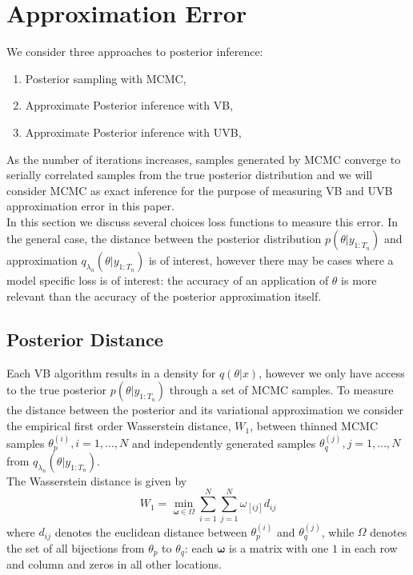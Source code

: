 \documentclass[12pt,a4paper]{article}\usepackage[]{graphicx}\usepackage[]{color}
\begin{document}
\iffalse
\section{Approximation Error}

We consider three approaches to posterior inference:
\begin{enumerate}
\item Posterior sampling with MCMC,
\item Approximate Posterior inference with VB,
\item Approximate Posterior inference with UVB,
\end{enumerate}

As the number of iterations increases, samples generated by MCMC converge to serially correlated samples from the true posterior distribution and we will consider MCMC as exact inference for the purpose of measuring VB and UVB approximation error in this paper.
\\

In this section we discuss several choices loss functions to measure this error. In the general case, the distance between the posterior distribution $p(\theta | y_{1:T_n})$ and approximation $q_{\lambda_n}(\theta |  y_{1:T_n})$ is of interest, however there may be cases where a model specific loss is of interest: the accuracy of an application of $\theta$ is more relevant than the accuracy of the posterior approximation itself. 


\subsection{Posterior Distance}

Each VB algorithm results in a density for $q(\theta | x)$, however we only have access to the true posterior $p(\theta | y_{1:T_n})$ through a set of MCMC samples. To measure the distance between the posterior and its variational approximation we consider the empirical first order Wasserstein distance, $W_1$, between thinned MCMC samples $\theta^{(i)}_p, i = 1, \dots, N$ and independently generated samples $\theta^{(j)}_q, j = 1, \dots, N$ from $q_{\lambda_n}(\theta |  y_{1:T_n})$.
\\

The Wasserstein distance is given by
\begin{equation}
\label{wasserstein}
W_1 = \underset{\boldsymbol{\omega} \in \Omega}{\min} \sum_{i=1}^N \sum_{j=1}^N \omega_{[ij]} d_{ij}
\end{equation}
where $d_{ij}$ denotes the euclidean distance between $\theta^{(i)}_p$ and $\theta^{(j)}_q$, while $\Omega$ denotes the set of all bijections from $\theta_p$ to $\theta_q$: each $\boldsymbol{\omega}$ is a matrix with one $1$ in each row and column and zeros in all other locations.
\\
\end{document}
